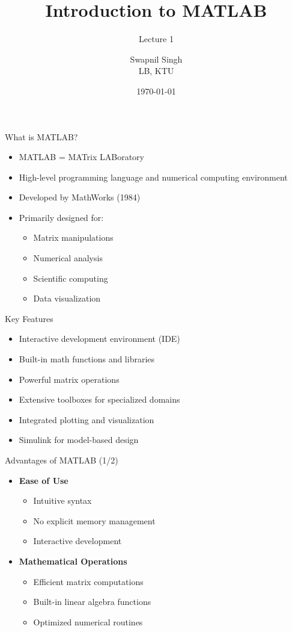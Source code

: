 \documentclass[10pt]{beamer}
\title{Introduction to MATLAB}
\subtitle{Lecture 1}
\author{Swapnil Singh\\LB, KTU}
\date{\today}
\theoremstyle{plain}%
\theoremstyle{definition}
\theoremstyle{remark}
\begin{document}
\begin{frame}
\titlepage
\end{frame}

\begin{frame}{What is MATLAB?}
\begin{itemize}
    \item MATLAB = MATrix LABoratory
    \item High-level programming language and numerical computing environment
    \item Developed by MathWorks (1984)
    \item Primarily designed for:
        \begin{itemize}
            \item Matrix manipulations
            \item Numerical analysis
            \item Scientific computing
            \item Data visualization
        \end{itemize}
\end{itemize}
\end{frame}

\begin{frame}{Key Features}
\begin{itemize}
    \item Interactive development environment (IDE)
    \item Built-in math functions and libraries
    \item Powerful matrix operations
    \item Extensive toolboxes for specialized domains
    \item Integrated plotting and visualization
    \item Simulink for model-based design
\end{itemize}
\end{frame}

\begin{frame}{Advantages of MATLAB (1/2)}
\begin{itemize}
    \item \textbf{Ease of Use}
        \begin{itemize}
            \item Intuitive syntax
            \item No explicit memory management
            \item Interactive development
        \end{itemize}
    \item \textbf{Mathematical Operations}
        \begin{itemize}
            \item Efficient matrix computations
            \item Built-in linear algebra functions
            \item Optimized numerical routines
        \end{itemize}
\end{itemize}
\end{frame}
\end{document}
